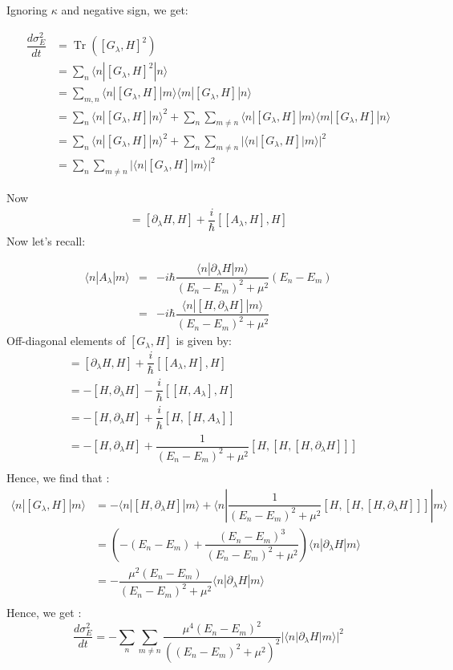 \documentclass[11pt,a4paper]{article}
\DeclareMathOperator{\Tr}{Tr}
\begin{document}
Ignoring $\kappa$ and negative sign, we get:

\begin{align}
\dfrac{d \sigma^2_E}{dt}&= \Tr ([G_{\lambda}, H]^2)\\
&= \sum_n \langle n |  [G_{\lambda}, H]^2  |    n \rangle  \\
&= \sum_{m,n} \langle n |  [G_{\lambda}, H]|  m \rangle \langle m |  [G_{\lambda}, H]  |    n \rangle \\
&= \sum_{n} \langle n |  [G_{\lambda}, H]|  n \rangle ^2   +  \sum_{ n} \sum_{m \neq n} \langle n |  [G_{\lambda}, H]|  m \rangle \langle m |  [G_{\lambda}, H]  |    n \rangle \\
&= \sum_{n} \langle n |  [G_{\lambda}, H]|  n \rangle ^2   +  \sum_{ n} \sum_{m \neq n} |\langle n |  [G_{\lambda}, H]|  m \rangle |^2 \\
&=  \sum_{ n} \sum_{m \neq n} |\langle n |  [G_{\lambda}, H]|  m \rangle |^2
\end{align}

Now \begin{align*}
 [G_{\lambda}, H]= [\partial_{\lambda} H,H] + \dfrac{i}{\hbar} [[A_{\lambda} , H],H]
\end{align*}
Now let's recall:

\begin{eqnarray}
\langle n | A_{\lambda} | m \rangle &=&  -i \hbar \dfrac{\langle n | \partial_{\lambda}H  | m \rangle}{(E_n-E_m)^2 + \mu^2} (E_n-E_m) \\
&=&  -i \hbar \dfrac{\langle n | [H, \partial_{\lambda} H]  | m \rangle}{(E_n-E_m)^2 + \mu^2} 
\end{eqnarray}
Off-diagonal elements of $[G_{\lambda}, H]$ is given by:
\begin{align}
 [G_{\lambda}, H] &= [\partial_{\lambda} H,H] + \dfrac{i}{\hbar} [[A_{\lambda} , H],H] \\
  &= -[H,\partial_{\lambda} H] - \dfrac{i}{\hbar} [[H,A_{\lambda}],H] \\
    &= -[H,\partial_{\lambda} H] + \dfrac{i}{\hbar} [H,[H,A_{\lambda}]] \\
 &=  -[H,\partial_{\lambda} H] + \dfrac{1}{(E_n-E_m)^2 + \mu^2}  [H,[H, [H, \partial_{\lambda} H]]] \\
 \end{align}
Hence, we find that :
\begin{align*}
\langle n |  [G_{\lambda}, H]|  m \rangle  &=  - \langle n |[H,\partial_{\lambda} H] |m \rangle +\langle n| \dfrac{1}{(E_n-E_m)^2 + \mu^2}  [H,[H, [H, \partial_{\lambda} H]]] | m\rangle \\
 &=  \left(-(E_n- E_m) + \dfrac{(E_n- E_m)^3}{(E_n-E_m)^2 + \mu^2} \right)  \langle n |\partial_{\lambda} H |m \rangle \\
 &=  -\dfrac{\mu^2 (E_n- E_m)}{(E_n-E_m)^2 + \mu^2}  \langle n |\partial_{\lambda} H |m \rangle \\
\end{align*}
Hence, we get :
\begin{equation}
\boxed{
\dfrac{d \sigma^2_E}{dt} =  - \sum_{ n} \sum_{m \neq n}\dfrac{\mu^4 (E_n- E_m)^2}{((E_n-E_m)^2 + \mu^2)^2}  |\langle n |\partial_{\lambda} H |m \rangle|^2}
\end{equation}
\end{document}
